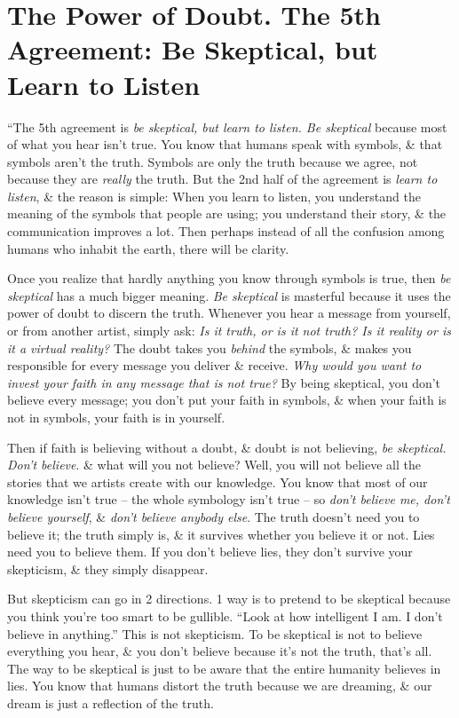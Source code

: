 \documentclass{article}
\numberwithin{equation}{section}
\begin{document}
\section{The Power of Doubt. The 5th Agreement: Be Skeptical, but Learn to Listen}
``The 5th agreement is \textit{be skeptical, but learn to listen. Be skeptical} because most of what you hear isn't true. You know that humans speak with symbols, \& that symbols aren't the truth. Symbols are only the truth because we agree, not because they are \textit{really} the truth. But the 2nd half of the agreement is \textit{learn to listen}, \& the reason is simple: When you learn to listen, you understand the meaning of the symbols that people are using; you understand their story, \& the communication improves a lot. Then perhaps instead of all the confusion among humans who inhabit the earth, there will be clarity.

Once you realize that hardly anything you know through symbols is true, then \textit{be skeptical} has a much bigger meaning. \textit{Be skeptical} is masterful because it uses the power of doubt to discern the truth. Whenever you hear a message from yourself, or from another artist, simply ask: \textit{Is it truth, or is it not truth? Is it reality or is it a virtual reality?} The doubt takes you \textit{behind} the symbols, \& makes you responsible for every message you deliver \& receive. \textit{Why would you want to invest your faith in any message that is not true?} By being skeptical, you don't believe every message; you don't put your faith in symbols, \& when your faith is not in symbols, your faith is in yourself.

Then if faith is believing without a doubt, \& doubt is not believing, \textit{be skeptical. Don't believe}. \& what will you not believe? Well, you will not believe all the stories that we artists create with our knowledge. You know that most of our knowledge isn't true -- the whole symbology isn't true -- so \textit{don't believe me, don't believe yourself}, \& \textit{don't believe anybody else}. The truth doesn't need you to believe it; the truth simply is, \& it survives whether you believe it or not. Lies need you to believe them. If you don't believe lies, they don't survive your skepticism, \& they simply disappear.

But skepticism can go in 2 directions. 1 way is to pretend to be skeptical because you  think you're too smart to be gullible. ``Look at how intelligent I am. I don't believe in anything.'' This is not skepticism. To be skeptical is not to believe everything you hear, \& you don't believe because it's not the truth, that's all. The way to be skeptical is just to be aware that the entire humanity believes in lies. You know that humans distort the truth because we are dreaming, \& our dream is just a reflection of the truth.
\end{document}

